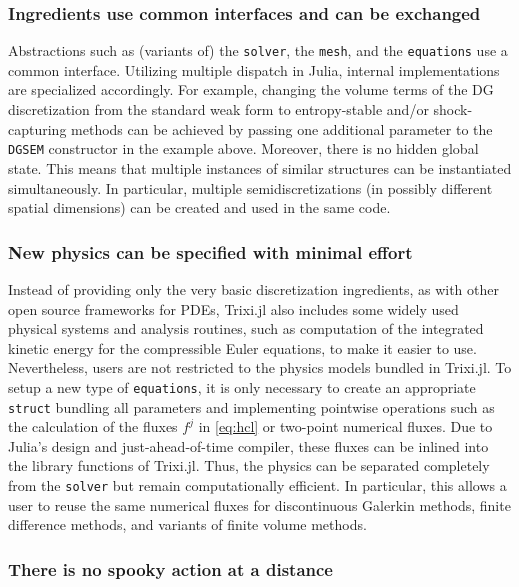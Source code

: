 \documentclass[hidelinks]{juliacon} %
\newcommand{\trixi}{Trixi.jl\xspace}
\begin{document}
\subsubsection{Ingredients use common interfaces and can be exchanged}

Abstractions such as (variants of) the \lstinline{solver}, the \lstinline{mesh},
and the \lstinline{equations} use a common interface. Utilizing multiple
dispatch in Julia, internal implementations are specialized accordingly. For
example, changing the volume terms of the DG discretization from the standard
weak form to entropy-stable and/or shock-capturing methods can be achieved by
passing one additional parameter to the \lstinline{DGSEM} constructor in the
example above. Moreover, there is no hidden global state. This means that multiple instances
of similar structures can be instantiated simultaneously. In particular, multiple
semidiscretizations (in possibly different spatial dimensions) can be created
and used in the same code.

\subsubsection{New physics can be specified with minimal effort}

Instead of providing only the very basic discretization ingredients, as with
other open source frameworks for PDEs, \trixi also includes some widely used
physical systems and analysis routines, such as computation of the integrated kinetic energy
for the compressible Euler equations,
to make it easier to use. Nevertheless, users are not restricted
to the physics models bundled in \trixi. To setup a new type of \lstinline{equations},
it is only necessary to create an appropriate \lstinline{struct} bundling all
parameters and implementing pointwise operations such as the calculation of
the fluxes $f^j$ in \eqref{eq:hcl} or two-point numerical fluxes. Due to Julia's
design and just-ahead-of-time compiler, these fluxes can be inlined into the
library functions of \trixi. Thus, the physics can be separated completely from
the \lstinline{solver} but remain computationally efficient. In particular, this allows
a user to reuse the same numerical fluxes for discontinuous Galerkin methods, finite
difference methods, and variants of finite volume methods.

\subsubsection{There is no spooky action at a distance}
\end{document}
